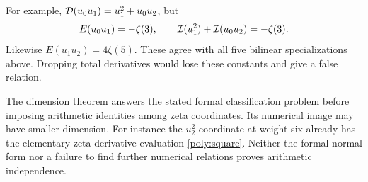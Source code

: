 For example, $\mathcal D(u_0u_1)=u_1^2+u_0u_2$, but
\begin{equation}\label{poly:boundaryexample}
 E(u_0u_1)=-\zeta(3),\qquad
 \mathcal I(u_1^2)+\mathcal I(u_0u_2)=-\zeta(3).
\end{equation}
Likewise $E(u_1u_2)=4\zeta(5)$. These agree with all five bilinear
specializations above. Dropping total derivatives would lose these
constants and give a false relation.

The dimension theorem answers the stated formal classification problem
before imposing arithmetic identities among zeta coordinates.
Its numerical image may have smaller dimension. For instance the
$u_2^2$ coordinate at weight six already has the elementary zeta-derivative
evaluation \eqref{poly:square}. Neither the formal normal form nor a
failure to find further numerical relations proves arithmetic independence.
